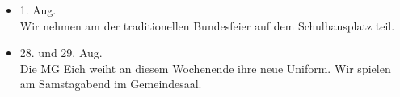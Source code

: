 \begin{history}
\begin{itemize}
        \item 1. Aug.\\
              Wir nehmen am der traditionellen Bundesfeier auf dem Schulhausplatz
              teil.

        \item 28. und 29. Aug.\\
              Die MG Eich weiht an diesem Wochenende ihre neue Uniform. Wir spielen am
              Samstagabend im Gemeindesaal.



    \end{itemize}

\end{history}
